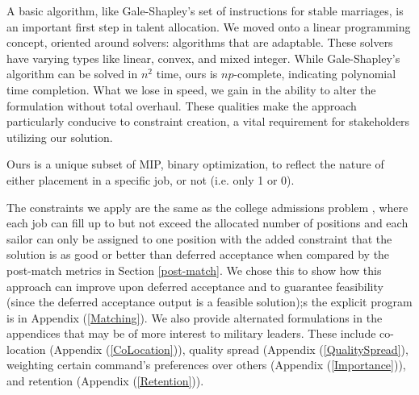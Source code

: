 A basic algorithm, like Gale-Shapley’s set of instructions for stable marriages, is an important first step in talent allocation. We moved onto a linear programming concept, oriented around solvers:  algorithms that are adaptable. These solvers have varying types like linear, convex, and mixed integer. While Gale-Shapley’s algorithm can be solved in $n^2$ time, ours is $np$-complete, indicating polynomial time completion. What we lose in speed, we gain in the ability to alter the formulation  without total overhaul. These qualities make the approach particularly conducive to constraint creation, a vital requirement for stakeholders utilizing our solution.

Ours is a unique subset of MIP, binary optimization, to reflect the nature of either placement in a specific job, or not (i.e. only 1 or 0). 


The constraints we apply are the same as the college admissions problem \cite{1985_Roth}, where each job can fill up to but not exceed the allocated number of positions and each sailor can only be assigned to one position with the added constraint that the solution is as good or better than deferred acceptance when compared by the post-match metrics in Section \ref{post-match}. We chose this to show how this approach can improve upon deferred acceptance and to guarantee feasibility (since the deferred acceptance output is a feasible solution);s the explicit program is in Appendix (\ref{Matching}). We also provide alternated formulations in the appendices that may be of more interest to military leaders. These include co-location (Appendix (\ref{CoLocation})), quality spread (Appendix (\ref{QualitySpread}), weighting certain command's preferences over others (Appendix (\ref{Importance})), and retention (Appendix (\ref{Retention})).


